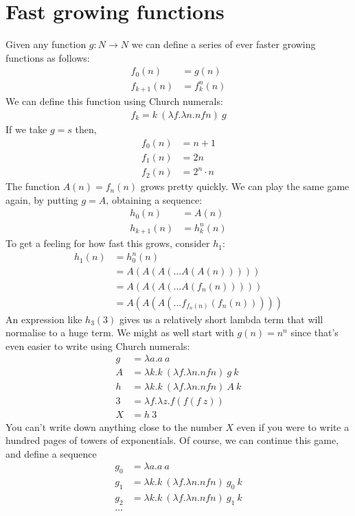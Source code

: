 \section{Fast growing functions}
Given any function $g : N \to N$ we can define a series of ever faster growing functions as follows:
\begin{align*}
  f_0(n) &= g(n)\\
  f_{k+1}(n) &= f^n_k(n)
\end{align*}
We can define this function using Church numerals:
\begin{align*}
  f_k = k\ (\lambda f. \lambda n. n f n)\ g
\end{align*}
If we take $g = s$ then,
\begin{align*}
  f_0(n) &= n+1\\
  f_1(n) &= 2n\\
  f_2(n) &= 2^n \cdot n
\end{align*}
The function $A(n) = f_n(n)$ grows pretty quickly. We can play the same game again, by putting $g = A$, obtaining a sequence:
\begin{align*}
  h_0(n) &= A(n)\\
  h_{k+1}(n) &= h^n_k(n)
\end{align*}
To get a feeling for how fast this grows, consider $h_1$:
\begin{align*}
  h_1(n) &= h_0^n(n)\\
         &= A(A(A(\dots A(A(n)))))\\
         &= A(A(A(\dots A(f_n(n)))))\\
         &= A(A(A(\dots f_{f_n(n)}(f_n(n)))))
\end{align*}
An expression like $h_3(3)$ gives us a relatively short lambda term that will normalise to a huge term. We might as well start with $g(n) = n^n$ since that's even easier to write using Church numerals:
\begin{align*}
  g &= \lambda a. a\ a\\
  A &= \lambda k. k\ (\lambda f. \lambda n. n f n)\ g\ k\\
  h &= \lambda k. k\ (\lambda f. \lambda n. n f n)\ A\ k\\
  3 &= \lambda f. \lambda z. f (f (f\ z))\\
  X &= h\ 3
\end{align*}
You can't write down anything close to the number $X$ even if you were to write a hundred pages of towers of exponentials. Of course, we can continue this game, and define a sequence
\begin{align*}
  g_0 &= \lambda a. a\ a\\
  g_1 &= \lambda k. k\ (\lambda f. \lambda n. n f n)\ g_0\ k\\
  g_2 &= \lambda k. k\ (\lambda f. \lambda n. n f n)\ g_1\ k\\
  \dots
\end{align*}
